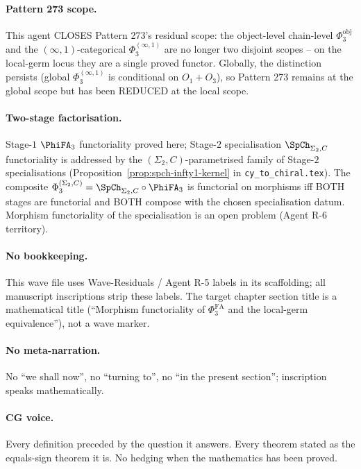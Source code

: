 \paragraph{Pattern 273 scope.}  This agent CLOSES Pattern 273's
residual scope: the object-level chain-level $\Phi_3^{\mathrm{obj}}$
and the $(\infty,1)$-categorical $\Phi_3^{(\infty,1)}$ are no longer
two disjoint scopes -- on the local-germ locus they are a single
proved functor.  Globally, the distinction persists (global
$\Phi_3^{(\infty,1)}$ is conditional on $O_1 + O_3$), so Pattern 273
remains at the global scope but has been REDUCED at the local scope.

\paragraph{Two-stage factorisation.}  Stage-$1$ $\PhiFA_3$ functoriality
proved here; Stage-$2$ specialisation $\SpCh_{\Sigma_2, C}$
functoriality is addressed by the $(\Sigma_2, C)$-parametrised family
of Stage-$2$ specialisations (Proposition~\ref{prop:spch-infty1-kernel}
in \texttt{cy\_to\_chiral.tex}).  The composite
$\Phi_3^{(\Sigma_2, C)} = \SpCh_{\Sigma_2, C} \circ \PhiFA_3$ is
functorial on morphisms iff BOTH stages are functorial and BOTH
compose with the chosen specialisation datum.  Morphism functoriality
of the specialisation is an open problem (Agent R-6 territory).

\paragraph{No bookkeeping.}  This wave file uses Wave-Residuals / Agent
R-5 labels in its scaffolding; all manuscript inscriptions strip
these labels.  The target chapter section title is a mathematical
title (``Morphism functoriality of $\Phi^{\mathrm{FA}}_3$ and the
local-germ equivalence''), not a wave marker.

\paragraph{No meta-narration.}  No ``we shall now'', no ``turning to'',
no ``in the present section''; inscription speaks mathematically.

\paragraph{CG voice.}  Every definition preceded by the question it
answers.  Every theorem stated as the equals-sign theorem it is.
No hedging when the mathematics has been proved.

